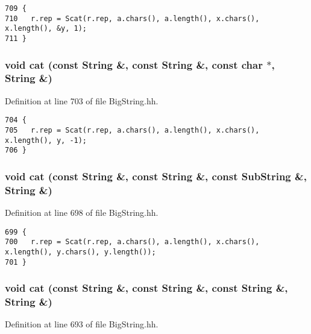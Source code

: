 \footnotesize\begin{verbatim}709 {
710   r.rep = Scat(r.rep, a.chars(), a.length(), x.chars(), x.length(), &y, 1);
711 }
\end{verbatim}\normalsize 
{}
\subsubsection{\setlength{\rightskip}{0pt plus 5cm}void cat (const String \&, const String \&, const char $\ast$, String \&)\hspace{0.3cm}{\tt  [friend]}}\label{classString_l15}




Definition at line 703 of file Big\-String.hh.



\footnotesize\begin{verbatim}704 {
705   r.rep = Scat(r.rep, a.chars(), a.length(), x.chars(), x.length(), y, -1);
706 }
\end{verbatim}\normalsize 
{}
\subsubsection{\setlength{\rightskip}{0pt plus 5cm}void cat (const String \&, const String \&, const {\bf Sub\-String} \&, String \&)\hspace{0.3cm}{\tt  [friend]}}\label{classString_l14}




Definition at line 698 of file Big\-String.hh.



\footnotesize\begin{verbatim}699 {
700   r.rep = Scat(r.rep, a.chars(), a.length(), x.chars(), x.length(), y.chars(), y.length());
701 }
\end{verbatim}\normalsize 
{}
\subsubsection{\setlength{\rightskip}{0pt plus 5cm}void cat (const String \&, const String \&, const String \&, String \&)\hspace{0.3cm}{\tt  [friend]}}\label{classString_l13}




Definition at line 693 of file Big\-String.hh.



